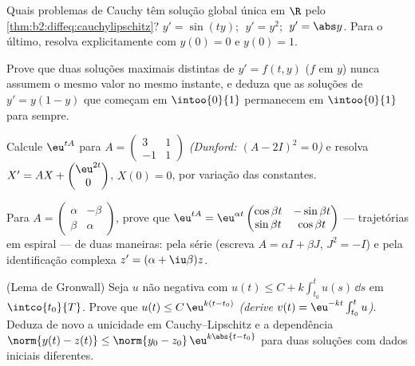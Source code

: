 \begin{exercise}[$\star$]\label{exo:b2:diffeq:2}
Quais problemas de Cauchy têm solução global única em $\R$ pelo
\cref{thm:b2:diffeq:cauchylipschitz}? $y' = \sin(ty)$; $\;y' =
y^2$; $\;y' = \abs y$. Para o último, resolva explicitamente com $y(0) =
0$ e $y(0) = 1$.
\end{exercise}

\begin{exercise}[$\star$]\label{exo:b2:diffeq:3}
Prove que duas soluções maximais distintas de $y' = f(t,y)$ ($f$
 em $y$) nunca assumem o mesmo valor no mesmo instante, e
deduza que as soluções de $y' = y(1 - y)$ que começam em
$\intoo{0}{1}$ permanecem em $\intoo{0}{1}$ para sempre.
\end{exercise}

\begin{exercise}[$\star\star$]\label{exo:b2:diffeq:4}
Calcule $\eu^{tA}$ para $A = \begin{pmatrix} 3 & 1\\ -1 &
1\end{pmatrix}$ \emph{(Dunford: $(A - 2I)^2 = 0$)} e resolva $X' =
AX + \begin{pmatrix} \eu^{2t}\\ 0\end{pmatrix}$, $X(0) = 0$, por
variação das constantes.
\end{exercise}

\begin{exercise}[$\star\star$]\label{exo:b2:diffeq:5}
Para $A = \begin{pmatrix} \alpha & -\beta\\ \beta &
\alpha\end{pmatrix}$, prove que $\eu^{tA} =
\eu^{\alpha t}\begin{pmatrix} \cos\beta t & -\sin\beta t\\
\sin\beta t & \cos\beta t\end{pmatrix}$ --- trajetórias em espiral ---
de duas maneiras: pela série (escreva $A = \alpha I + \beta J$, $J^2 =
-I$) e pela identificação complexa $z' = (\alpha +
\iu\beta)z$.
\end{exercise}

\begin{exercise}[$\star\star$]\label{exo:b2:diffeq:6}
(Lema de Gronwall) Seja $u$  não negativa com $u(t)
\leq C + k\int_{t_0}^{t} u(s)\,\dd s$ em $\intco{t_0}{T}$. Prove que
$u(t) \leq C\,\eu^{k(t - t_0)}$ \emph{(derive $v(t) =
\eu^{-kt}\int_{t_0}^t u$)}. Deduza de novo a unicidade em
Cauchy--Lipschitz e a dependência  $\norm{y(t) -
z(t)} \leq \norm{y_0 - z_0}\,\eu^{k\abs{t - t_0}}$ para duas
soluções com dados iniciais diferentes.
\end{exercise}

